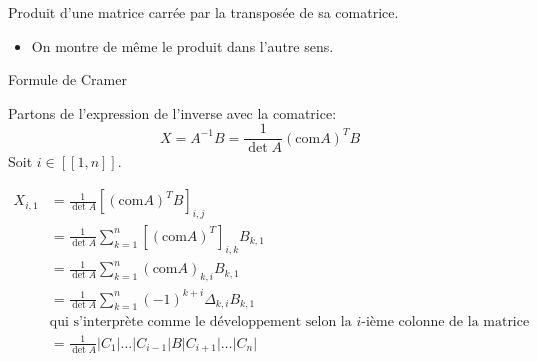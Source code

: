 \documentclass{article}
\renewenvironment{question_kholle}[2][ ]
{
	\subsection{\texorpdfstring{#2}{}}
	\notblank{#1}
	{
		\noindent #1
		\bigbreak
	}
	{}
	\begin{proof}
}
{
	\end{proof}
}
\begin{document}
\begin{question_kholle}[{Soit $A \in \mathcal{M}_{n}(\K)$.
    Alors $A \times (\mathrm{com} A)^{T} = (\mathrm{com}A)^{T}\times A = \det A \times I_{n}$
    }]{Produit d'une matrice carrée par la transposée de sa comatrice.}
\begin{itemize}[label=$\lozenge$]
\begin{itemize}[label=$\star$]
            Car les lignes d'indice $i$ et $j$ sont identiques.
            Ainsi, pour tout $(i, j) \in [ \! [ 1, n ] \!]^{2}, [A\times(\mathrm{com}A)^{T}]_{i,j}=\delta_{i,j}\times \det A$
            Donc
$$
            [A\times(\mathrm{com}A)^{T}]_{i,j}=\det A\times I_{n}
$$
        \end{itemize}
        \item On montre de même le produit dans l'autre sens.
    \end{itemize}
\end{question_kholle}
\begin{question_kholle}[{  Le système linéaire $AX=B$ d'inconnue $X \in \mathcal{M}_{n,1}(\K)$ et de paramètre $B \in \mathcal{M}_{n,1}(\K)$ est dit "de Cramer" s'il admet une unique solution, à savoir si $A$ est une matrice inversible. Dans ce cas, la solution peut être exprimée explicitement par la formule $A^{-1}B$ qui donne la formule dite de Cramer:
    $$
    \left( \frac{
    \bigg| 
    B\mid C_{2}\mid\dots \mid C_{n}
    \bigg| 
    }{\det A}, \dots, \frac{
    \bigg|
    C_{1} \mid
    \dots \mid
    C_{i-1}\mid
    B \mid
    C_{i+1}\mid
    \dots \mid
    C_{n}
    \bigg|
    }{\det A}, \dots, \frac{
    \bigg| 
    C_{1}\mid C_{2}\mid\dots \mid B
    \bigg| 
    }{\det A} \right)
    $$
    où $(C_{1}, \dots, C_{n}) \in \mathcal{M}_{n,1}(\K)^{n}$ sont les colonnes de $A$.
    }]{Formule de Cramer}
    
    Partons de l'expression de l'inverse avec la comatrice:
    $$X = A^{-1}B= \frac{1}{\det A}(\mathrm{com}A)^{T} B$$
    Soit $i \in [ \! [ 1, n ] \!]$.
    
    \begin{align*}
        X_{i, 1} &= \frac{1}{\det A}[(\mathrm{com}A)^{T}B]_{i,j} \\
        &= \frac{1}{\det A}\sum_{k=1}^{n}[(\mathrm{com}A)^{T}]_{i,k}B_{k,1} \\
        &= \frac{1}{\det A}\sum_{k=1}^{n}(\mathrm{com}A)_{k,i}B_{k, 1} \\
        &= \frac{1}{\det A}\sum_{k=1}^{n}(-1)^{k+i}\Delta_{k,i}B_{k, 1} \\
        &\text{qui s'interprète comme le développement selon la $i$-ième colonne de la matrice} \\
        &= \frac{1}{\det A}\Bigg|C_{1}\Bigg|\dots\Bigg|C_{i-1}\Bigg|B\Bigg|C_{i+1}\Bigg|\dots\Bigg|C_{n}\Bigg|
    \end{align*}
\end{question_kholle}
\end{document}
